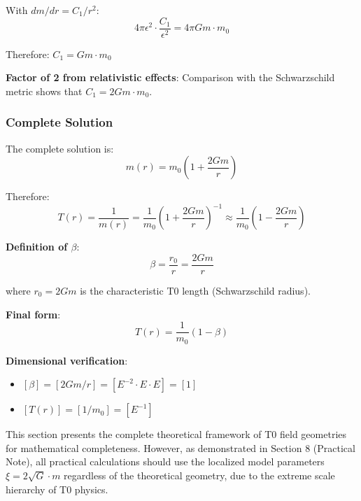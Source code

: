 \documentclass[12pt,a4paper]{article}
\begin{document}
	With $dm/dr = C_1/r^2$:
	\begin{equation}
		4\pi \epsilon^2 \cdot \frac{C_1}{\epsilon^2} = 4\pi G m \cdot m_0
	\end{equation}
	
	Therefore: $C_1 = G m \cdot m_0$
	
	\textbf{Factor of 2 from relativistic effects}: Comparison with the Schwarzschild metric shows that $C_1 = 2G m \cdot m_0$.
	
	\subsubsection{Complete Solution}
	\label{subsubsec:complete_solution}
	
	The complete solution is:
	\begin{equation}
		m(r) = m_0\left(1 + \frac{2Gm}{r}\right)
	\end{equation}
	
	Therefore:
	\begin{equation}
		T(r) = \frac{1}{m(r)} = \frac{1}{m_0}\left(1 + \frac{2Gm}{r}\right)^{-1} \approx \frac{1}{m_0}\left(1 - \frac{2Gm}{r}\right)
	\end{equation}
	
	\textbf{Definition of $\beta$}:
	\begin{equation}
		\boxed{\beta = \frac{r_0}{r} = \frac{2Gm}{r}}
	\end{equation}
	
	where $r_0 = 2Gm$ is the characteristic T0 length (Schwarzschild radius).
	
	\textbf{Final form}:
	\begin{equation}
		\boxed{T(r) = \frac{1}{m_0}(1 - \beta)}
	\end{equation}
	
	\textbf{Dimensional verification}:
	\begin{itemize}
		\item $[\beta] = [2Gm/r] = [E^{-2} \cdot E \cdot E] = [1]$ \checkmark
		\item $[T(r)] = [1/m_0] = [E^{-1}]$ \checkmark
	\end{itemize}
\begin{tcolorbox}[colback=orange!5!white,colframe=orange!75!black,title=Important Methodological Note]
	This section presents the complete theoretical framework of T0 field geometries for mathematical completeness. However, as demonstrated in Section 8 (Practical Note), all practical calculations should use the localized model parameters $\xi = 2\sqrt{G} \cdot m$ regardless of the theoretical geometry, due to the extreme scale hierarchy of T0 physics.
\end{tcolorbox}	
\end{document}

